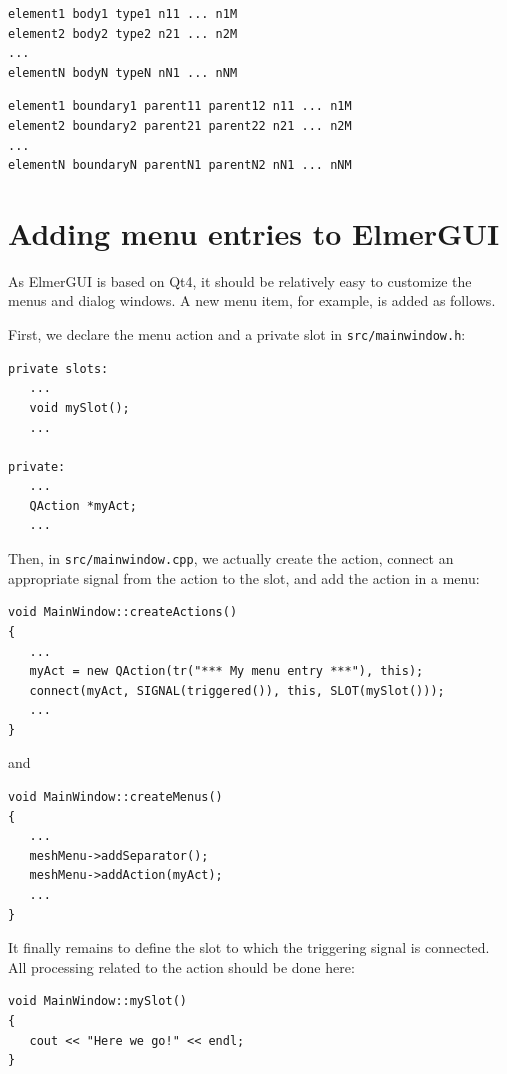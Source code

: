 \vskip5mm

\begin{verbatim}
element1 body1 type1 n11 ... n1M
element2 body2 type2 n21 ... n2M
...
elementN bodyN typeN nN1 ... nNM
\end{verbatim}

\vskip5mm

\begin{verbatim}
element1 boundary1 parent11 parent12 n11 ... n1M
element2 boundary2 parent21 parent22 n21 ... n2M
...
elementN boundaryN parentN1 parentN2 nN1 ... nNM
\end{verbatim}

\newpage

\chapter{Adding menu entries to ElmerGUI}

As ElmerGUI is based on Qt4, it should be relatively easy to customize the menus
and dialog windows. A new menu item, for example, is added as follows.

First, we declare the menu action and a private slot in {\tt src/mainwindow.h}:
\begin{verbatim}
private slots:
   ...
   void mySlot();
   ...

private:
   ...
   QAction *myAct;
   ...
\end{verbatim}

Then, in {\tt src/mainwindow.cpp}, we actually create the action, connect
an appropriate signal from the action to the slot, and add the action in
a menu:
\begin{verbatim}
void MainWindow::createActions()
{
   ...
   myAct = new QAction(tr("*** My menu entry ***"), this);
   connect(myAct, SIGNAL(triggered()), this, SLOT(mySlot()));
   ...
}
\end{verbatim}
and
\begin{verbatim}
void MainWindow::createMenus()
{
   ...
   meshMenu->addSeparator();
   meshMenu->addAction(myAct);
   ...
}
\end{verbatim}

It finally remains to define the slot to which the triggering signal is connected.
All processing related to the action should be done here:
\begin{verbatim}
void MainWindow::mySlot()
{
   cout << "Here we go!" << endl;
}
\end{verbatim}

